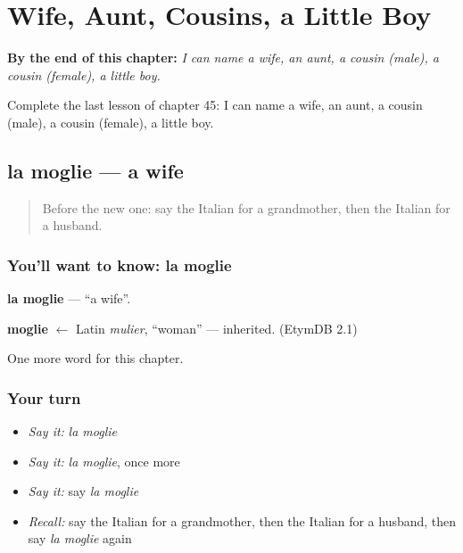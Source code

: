 
\chapter{Wife, Aunt, Cousins, a Little Boy}
\label{ch:it-wife-aunt-cousins-a-little-boy}

\begin{chapteropening}
\textbf{By the end of this chapter:} \emph{I can name a wife, an aunt, a cousin (male), a cousin (female), a little boy.}

Complete the last lesson of chapter 45: I can name a wife, an aunt, a cousin (male), a cousin (female), a little boy.
\end{chapteropening}

\section[la moglie]{la moglie — a wife}

\label{lesson:IT-C45-moglie}



\begin{quote}
Before the new one: say the Italian for a grandmother, then the Italian for a husband.
\end{quote}

\subsection*{You'll want to know: la moglie}
\textbf{la moglie} — \textquotedblleft{}a wife\textquotedblright{}.

\begin{cousinweb}
\textbf{moglie} $\leftarrow$ Latin \emph{mulier}, \textquotedblleft{}woman\textquotedblright{} — inherited. (EtymDB 2.1)
\end{cousinweb}

\begin{grammarlens}[title={What you've built}]
One more word for this chapter.
\end{grammarlens}

\subsection*{Your turn}
\begin{itemize}
\raggedright
  \item \emph{Say it:} \emph{la moglie}
  \item \emph{Say it:} \emph{la moglie}, once more
  \item \emph{Say it:} say \emph{la moglie}
  \item \emph{Recall:} say the Italian for a grandmother, then the Italian for a husband, then say \emph{la moglie} again
\end{itemize}

